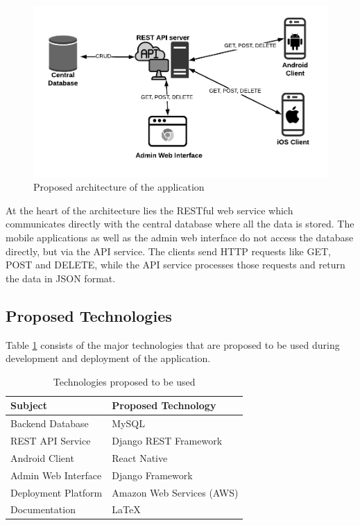 \documentclass[12pt, a4paper, oneside]{article}
\begin{document}
\begin{figure}[h]
\includegraphics[width=\linewidth]{architecture}
\centering
\caption{Proposed architecture of the application}
\label{fig:arch}
\end{figure}

At the heart of the architecture lies the RESTful web service which communicates directly with the central database where all the data is stored. The mobile applications as well as the admin web interface do not access the database directly, but via the API service. The clients send HTTP requests like GET, POST and DELETE, while the API service processes those requests and return the data in JSON format.

\subsection{Proposed Technologies}
Table \ref{table:tech} consists of the major technologies that are proposed to be used during development and deployment of the application.

\renewcommand{\arraystretch}{1.5}
\begin{table}[]
\begin{tabular}{|l|l|}
\hline
\rowcolor[HTML]{C0C0C0} 
\textbf{Subject}    & \textbf{Proposed Technology} \\ \hline
Backend Database            & MySQL                        \\ \hline
REST API Service    & Django REST Framework        \\ \hline
Android Client  & React Native                 \\ \hline
Admin Web Interface & Django Framework             \\ \hline
Deployment Platform & Amazon Web Services (AWS)    \\ \hline
Documentation & LaTeX \\ \hline
\end{tabular}
\caption{Technologies proposed to be used}
\label{table:tech}
\end{table}
\end{document}
